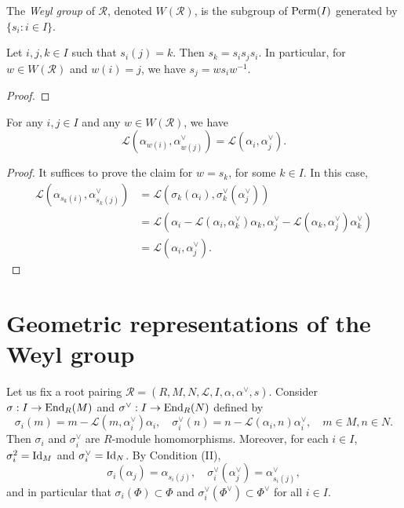 \begin{definition}
    The {\it Weyl group} of $\mathcal{R}$, denoted $W(\mathcal{R})$, is the subgroup of ${\rm Perm}(I)$ 
    generated by $\{s_i : i \in I\}$. 
\end{definition}
\begin{lemma}
    Let $i,j,k \in I$ such that $s_i(j) = k$. Then $s_k = s_is_js_i$. In particular, for 
    $w \in W(\mathcal{R})$ and $w(i) = j$, we have $s_j = ws_iw^{-1}$. 
\end{lemma}
\begin{proof}

\end{proof}

\begin{lemma}
    For any $i,j \in I$ and any $w \in W(\mathcal{R})$, we have 
    \[
        \mathcal{L}(\alpha_{w(i)},\alpha^\vee_{w(j)}) = \mathcal{L}(\alpha_{i},\alpha_j^\vee).
    \]
\end{lemma}
\begin{proof}
    It suffices to prove the claim for $w = s_k$, for some $k \in I$. In this case, 
    \begin{align*}
        \mathcal{L}(\alpha_{s_k(i)},\alpha^\vee_{s_k(j)}) &=  \mathcal{L}(\sigma_k(\alpha_{i}),\sigma_k^\vee(\alpha^\vee_{j}))\\
                                &= \mathcal{L}(\alpha_{i} - \mathcal{L}(\alpha_i,\alpha_k^\vee)\alpha_k,\alpha^\vee_{j} - \mathcal{L}(\alpha_k,\alpha_j^\vee) \alpha_k^\vee)\\
                            & = \mathcal{L}(\alpha_{i},\alpha^\vee_{j}).
    \end{align*}
\end{proof}

\section{Geometric representations of the Weyl group}
Let us fix a root pairing $\mathcal{R} = (R,M,N,\mathcal{L},I,\alpha, \alpha^\vee,s)$. Consider $\sigma: I \to {\rm End}_R(M)$ and 
$\sigma^\vee : I \to {\rm End}_R(N)$ defined by
\[
    \sigma_i(m) = m - \mathcal{L}(m,\alpha^\vee_i)\alpha_i, \quad \sigma^\vee_i(n) = n - \mathcal{L}(\alpha_i,n)\alpha^\vee_i, \quad m \in M, n \in N.
\]
Then $\sigma_i$ and $\sigma^\vee_i$ are $R$-module homomorphisms. Moreover, 
for each $i \in I$, $\sigma_i^2 = {\rm Id}_M$ and $\sigma_i^\vee = {\rm Id}_N$. By Condition (II), 
\[
    \sigma_i(\alpha_j) = \alpha_{s_i(j)}, \quad \sigma^\vee_i(\alpha^\vee_j) = \alpha^\vee_{s_i(j)},
\]
and in particular that $\sigma_i(\Phi) \subset \Phi$ and 
$\sigma_i^\vee(\Phi^\vee) \subset \Phi^\vee$ for all $i \in I$.




